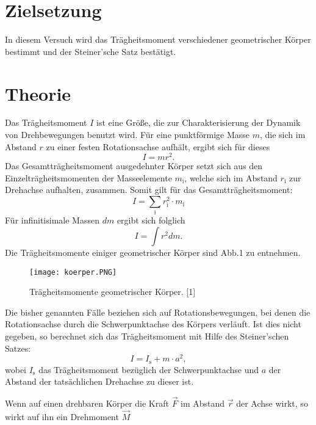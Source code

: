 \section{Zielsetzung}
\label{sec:Zielsetzung}
In diesem Versuch wird das Trägheitsmoment verschiedener
geometrischer Körper bestimmt und der Steiner'sche Satz bestätigt.



\section{Theorie}
\label{sec:Theorie}

Das Trägheitsmoment $I$ ist eine Größe, die zur Charakterisierung
der Dynamik von Drehbewegungen benutzt wird. Für eine
punktförmige Masse $m$, die sich im Abstand $r$ zu einer festen
Rotationsachse aufhält, ergibt sich für dieses
\begin{equation}
I = mr^2.
\end{equation}
Das Gesamtträgheitsmoment ausgedehnter Körper setzt sich aus den
Einzelträgheitsmomenten der Masseelemente $m_{\text{i}}$,
welche sich im Abstand $r_{\text{i}}$ zur Drehachse aufhalten,
zusammen. Somit gilt für das Gesamtträgheitsmoment:
\begin{equation}
I = \sum_{\text{i}} r_{\text{i}}^2 \cdot m_{\text{i}}
\end{equation}
Für infinitisimale Massen $dm$ ergibt sich folglich
\begin{equation}
I = \int r^2 dm.
\end{equation}
Die Trägheitsmomente einiger geometrischer Körper sind Abb.1 zu
entnehmen.
\begin{figure}[H]
\centering
\caption{Trägheitsmomente geometrischer Körper. [1]}
\texttt{[image: koerper.PNG]}
\label{fig:koerper}
\end{figure}
Die bisher genannten Fälle beziehen sich auf Rotationsbewegungen,
bei denen die Rotationsachse durch die Schwerpunktachse des
Körpers verläuft. Ist dies nicht gegeben, so berechnet sich
das Trägheitsmoment mit Hilfe des Steiner'schen Satzes:
\begin{equation*}
I = I_{\text{s}} + m \cdot a^2,
\end{equation*}
wobei $I_{\text{s}}$ das Trägheitsmoment bezüglich der
Schwerpunktachse und $a$ der Abstand der
tatsächlichen Drehachse zu dieser ist.
\par
Wenn auf einen drehbaren Körper die Kraft $\vec{F}$ im Abstand
$\vec{r}$ der Achse wirkt, so wirkt auf ihn ein Drehmoment
$\vec{M}$
